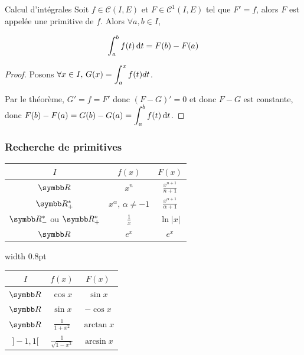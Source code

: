 \begin{corollaire}{Calcul d'intégrales}{}
    Soit $f \in \mathscr C(I, E)$ et $F \in \mathscr C^1(I, E)$ tel que 
    $F' = f$, alors $F$ est appelée une primitive de $f$. Alors $\forall a, b \in I$, 
    
    \[\displaystyle \int_a^b f(t) \,\mathrm{d}t = F(b) - F(a)\]
\end{corollaire}


\begin{proof}
    Posons $\displaystyle \forall x \in I, \, G(x) = \int_a^x f(t) dt$.

    Par le théorème, $G' = f = F'$ donc $(F - G)' = 0$ et donc $F - G$ est constante, 
    donc $\displaystyle F(b) - F(a) = G(b) - G(a) = \int_a^b f(t) \,\mathrm{d}t$.
\end{proof}

\subsubsection{Recherche de primitives}
\begin{table}[htpb]
\centering
\renewcommand{\arraystretch}{1.6}
\begin{minipage}[t]{0.44\linewidth}
    \centering
    \begin{tabular}{ccc}
        \toprule
        $I$ & $f(x)$ & $F(x)$ \\
        \midrule
        $\R$     & $x^n$         & $\frac{x^{n+1}}{n+1}$ \\
        $\R^*_+$ & $x^\alpha$, $\alpha \not = -1$   & $\frac{x^{\alpha+1}}{\alpha+1}$ \\
        $\R^*_-$ ou $\R^*_+$   & $\frac{1}{x}$ & $\ln|x|$ \\
        $\R$     & $e^x$         & $e^x$ \\
        \bottomrule
    \end{tabular}
\end{minipage}
\hfill
{\color{black!50}\vrule width 0.8pt}%
\hfill
\begin{minipage}[t]{0.44\linewidth}
    \centering
    \begin{tabular}{ccc}
        \toprule
        $I$ & $f(x)$ & $F(x)$ \\
        \midrule
        $\R$      & $\cos x$                  & $\sin x$ \\
        $\R$      & $\sin x$                  & $-\cos x$ \\
        $\R$      & $\frac{1}{1+x^2}$         & $\arctan x$ \\
        $]-1, 1[$ & $\frac{1}{\sqrt{1-x^2}}$  & $\arcsin x$ \\
        \bottomrule
    \end{tabular}
\end{minipage}
\end{table}

